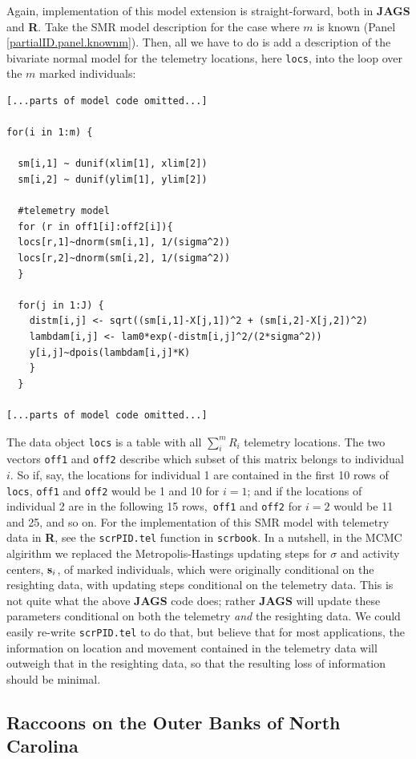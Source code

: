 Again, implementation of this model extension is straight-forward,
both in {\bf JAGS} and {\bf R}. Take the SMR model description for the
case where $m$ is known (Panel \ref{partialID.panel.knownm}). Then,
all we have to do is add a description of the bivariate normal model
for the telemetry locations, here {\tt locs}, into the loop over the
$m$ marked individuals: 
{\small
\begin{verbatim}
[...parts of model code omitted...]

for(i in 1:m) {

  sm[i,1] ~ dunif(xlim[1], xlim[2])
  sm[i,2] ~ dunif(ylim[1], ylim[2])

  #telemetry model
  for (r in off1[i]:off2[i]){
  locs[r,1]~dnorm(sm[i,1], 1/(sigma^2))
  locs[r,2]~dnorm(sm[i,2], 1/(sigma^2))
  }

  for(j in 1:J) {
    distm[i,j] <- sqrt((sm[i,1]-X[j,1])^2 + (sm[i,2]-X[j,2])^2)
    lambdam[i,j] <- lam0*exp(-distm[i,j]^2/(2*sigma^2))
    y[i,j]~dpois(lambdam[i,j]*K)
    }
  }

[...parts of model code omitted...]
\end{verbatim}
}
The data object {\tt locs} is a table with all $\sum_i^m R_i$
telemetry locations. The two vectors {\tt off1} and {\tt off2}
describe which subset of this matrix belongs to individual $i$. So if,
say, the locations for individual 1 are contained in the first 10 rows
of {\tt locs}, {\tt off1} and {\tt off2} would be 1 and 10 for $i=1$;
and if the locations of individual 2 are in the following 15 rows,{\tt
  off1} and {\tt off2} for $i=2$ would be 11 and 25, and so on. For
the implementation of this SMR model with telemetry data in {\bf R},
see the {\tt scrPID.tel} function in {\tt scrbook}. In a nutshell, in
the MCMC algirithm we replaced the Metropolis-Hastings updating steps
for $\sigma$ and activity centers, ${\bf s}_i$, of marked individuals, which were originally
conditional on the resighting data, with updating steps conditional on
the telemetry data. This is not quite what the above {\bf JAGS} code
does; rather {\bf JAGS} will update these parameters conditional on
both the telemetry \emph{and} the resighting data. We could easily
re-write {\tt scrPID.tel} to do that, but believe that for most
applications, the information on location and movement contained in
the telemetry data will outweigh that in the resighting data, so that
the resulting loss of information should be minimal.

\subsection{Raccoons on the Outer Banks of North Carolina}

